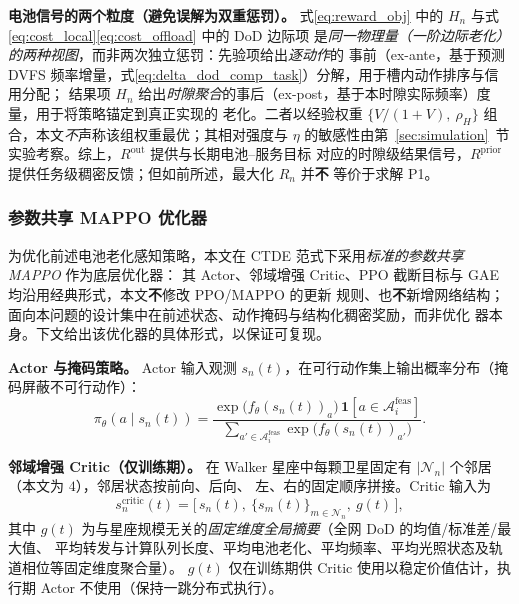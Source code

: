 \documentclass[a4paper,11pt]{article}
\begin{document}
\noindent\textbf{电池信号的两个粒度（避免误解为双重惩罚）。}
式\eqref{eq:reward_obj} 中的 $H_n$ 与式\eqref{eq:cost_local}\eqref{eq:cost_offload} 中的 DoD 边际项
是\emph{同一物理量（一阶边际老化）的两种视图}，而非两次独立惩罚：先验项给出\emph{逐动作}的
事前（ex-ante，基于预测 DVFS 频率增量，式\eqref{eq:delta_dod_comp_task}）分解，用于槽内动作排序与信用分配；
结果项 $H_n$ 给出\emph{时隙聚合}的事后（ex-post，基于本时隙实际频率）度量，用于将策略锚定到真正实现的
老化。二者以经验权重 $\{V/(1+V),\ \rho_H\}$ 组合，本文\emph{不}声称该组权重最优；其相对强度与
$\eta$ 的敏感性由第~\ref{sec:simulation}~节实验考察。综上，$R^{\mathrm{out}}$ 提供与长期电池--服务目标
对应的时隙级结果信号，$R^{\mathrm{prior}}$ 提供任务级稠密反馈；但如前所述，最大化 $R_n$ 并\textbf{不}
等价于求解 P1。

\subsubsection{参数共享 MAPPO 优化器}
\label{subsec:updates}

为优化前述电池老化感知策略，本文在 CTDE 范式下采用\emph{标准的参数共享 MAPPO} 作为底层优化器：
其 Actor、邻域增强 Critic、PPO 截断目标与 GAE 均沿用经典形式，本文\textbf{不}修改 PPO/MAPPO 的更新
规则、也\textbf{不}新增网络结构；面向本问题的设计集中在前述状态、动作掩码与结构化稠密奖励，而非优化
器本身。下文给出该优化器的具体形式，以保证可复现。

\noindent\textbf{Actor 与掩码策略。}
Actor 输入观测 $s_n(t)$，在可行动作集上输出概率分布（掩码屏蔽不可行动作）：
\begin{equation}
\pi_\theta(a \mid s_n(t))
= \frac{\exp\!\big(f_\theta(s_n(t))_a\big)\,\mathbf{1}[a \in \mathcal{A}^{\mathrm{feas}}_i]}
{\sum_{a'\in\mathcal{A}^{\mathrm{feas}}_i}\exp\!\big(f_\theta(s_n(t))_{a'}\big)}.
\label{eq:actor}
\end{equation}

\noindent\textbf{邻域增强 Critic（仅训练期）。}
在 Walker 星座中每颗卫星固定有 $|\mathcal{N}_n|$ 个邻居（本文为 $4$），邻居状态按前向、后向、
左、右的固定顺序拼接。Critic 输入为
\begin{equation}
s^{\mathrm{critic}}_n(t) = \big[\,s_n(t),\ \{s_m(t)\}_{m \in \mathcal{N}_n},\ g(t)\,\big],
\label{eq:critic_input}
\end{equation}
其中 $g(t)$ 为与星座规模无关的\emph{固定维度全局摘要}（全网 DoD 的均值/标准差/最大值、
平均转发与计算队列长度、平均电池老化、平均频率、平均光照状态及轨道相位等固定维度聚合量）。
$g(t)$ 仅在训练期供 Critic 使用以稳定价值估计，执行期 Actor 不使用（保持一跳分布式执行）。
\end{document}
